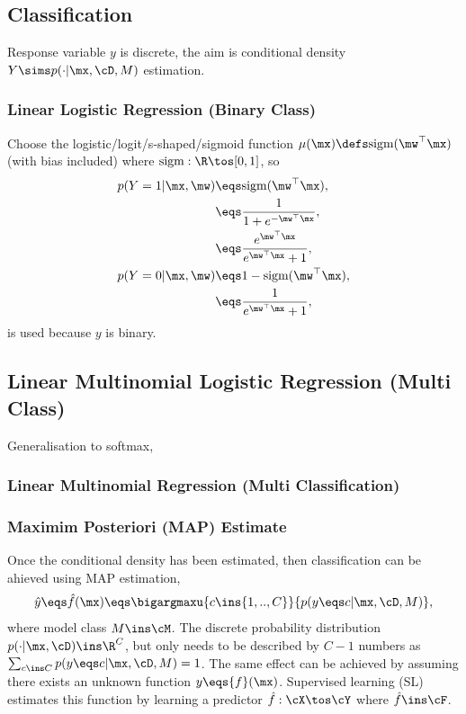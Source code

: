 \documentclass[11pt,a4paper]{report}
\begin{document}
\subsection {Classification}
Response variable $y$ is discrete, the aim is conditional density $Y\sims p(\cdot|\mx,\cD,M)$ estimation.


\subsubsection{Linear Logistic Regression (Binary Class)}
Choose the logistic/logit/s-shaped/sigmoid function $\mu(\mx)\defs\text{sigm}(\mw^{\top}\mx)$ (with bias included) where $\text{sigm}:\R\tos[0,1]$, so
\begin{align*}
	p(Y=1|\mx,\mw)\eqs&\text{sigm}(\mw^{\top}\mx),\\
	\eqs&\frac{1}{1+e^{-\mw^{\top}\mx}},\\
	\eqs&\frac{e^{\mw^{\top}\mx}}{e^{\mw^{\top}\mx}+1},\\
	p(Y=0|\mx,\mw)\eqs&1-\text{sigm}(\mw^{\top}\mx),\\
	\eqs&\frac{1}{e^{\mw^{\top}\mx}+1},
\end{align*}
is used because $y$ is binary.

\subsection{Linear Multinomial Logistic Regression (Multi Class)}
Generalisation to softmax,



\subsubsection{Linear Multinomial Regression (Multi Classification)}

\subsubsection{Maximim Posteriori (MAP) Estimate}
Once the conditional density has been estimated, then classification can be ahieved using MAP estimation,
\begin{align}
	\hat{y}\eqs\hat{f}(\mx)\eqs\bigargmaxu{c\ins\{1,..,C\}}{p(y\eqs c|\mx,\cD,M)},
\end{align}
where model class $M\ins\cM$. The discrete probability distribution $p(\cdot|\mx,\cD)\ins\R^{C}$, but only needs to be described by $C-1$ numbers as $\sum_{c\ins C}p(y\eqs c|\mx,\cD,M)=1$. The same effect can be achieved by assuming there exists an unknown function $y\eqs{f}(\mx)$. Supervised learning (SL) estimates this function by learning a predictor $\hat{f}:\cX\tos\cY$ where $\hat{f}\ins\cF$.
 
\end{document}
